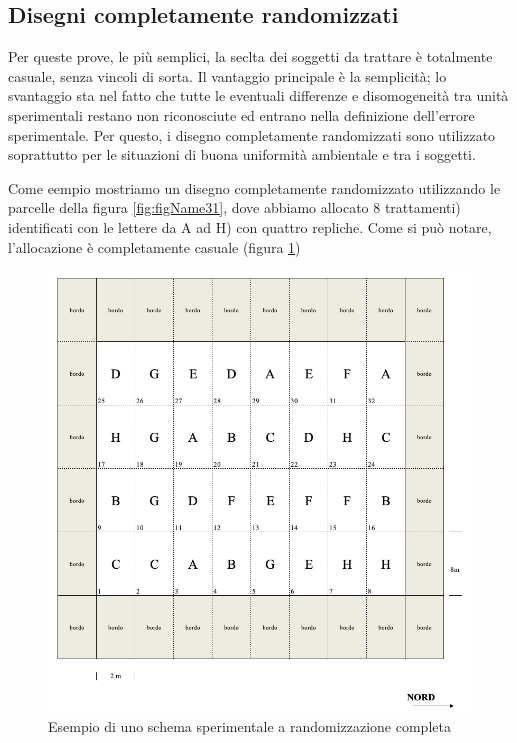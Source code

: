 \documentclass[a4paper,12pt,oneside]{book}
\theoremstyle{definition}
\theoremstyle{definition}
\theoremstyle{definition}
\theoremstyle{remark}
\begin{document}
\subsection{Disegni completamente
randomizzati}\label{disegni-completamente-randomizzati}

Per queste prove, le più semplici, la seclta dei soggetti da trattare è
totalmente casuale, senza vincoli di sorta. Il vantaggio principale è la
semplicità; lo svantaggio sta nel fatto che tutte le eventuali
differenze e disomogeneità tra unità sperimentali restano non
riconosciute ed entrano nella definizione dell'errore sperimentale. Per
questo, i disegno completamente randomizzati sono utilizzato soprattutto
per le situazioni di buona uniformità ambientale e tra i soggetti.

Come eempio mostriamo un disegno completamente randomizzato utilizzando
le parcelle della figura \ref{fig:figName31}, dove abbiamo allocato 8
trattamenti) identificati con le lettere da A ad H) con quattro
repliche. Come si può notare, l'allocazione è completamente casuale
(figura \ref{fig:figName33})

\begin{figure}

{\centering \includegraphics[width=0.9\linewidth]{_images/Mappa1CRD} 

}

\caption{Esempio di uno schema sperimentale a randomizzazione completa}\label{fig:figName33}
\end{figure}
\end{document}
